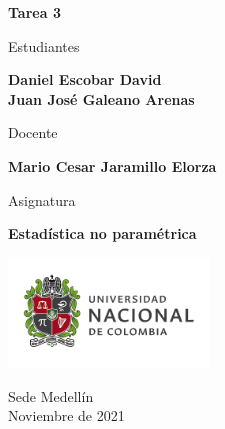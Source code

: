 \begin{titlepage}
   \Large{
   \begin{center}
       \vspace*{1cm}

       \textbf{Tarea 3}

            
       \vspace{1.5cm}
       
       Estudiantes
       
       \vspace{0.5cm}
        
        
       \textbf{Daniel Escobar David} \\

	\textbf{Juan José Galeano Arenas}

              \vspace{1cm}
       
       Docente
       
       \vspace{0.5cm}

       \textbf{Mario Cesar Jaramillo Elorza}
       
       \vspace{0.4cm}

       \vspace{1.4cm}
       
       Asignatura
       
       \vspace{0.5cm}

       \textbf{Estadística no paramétrica}

       \vfill

            
       \vspace{0.4cm}
     
       \includegraphics[width=0.4\textwidth]{logounal.png}
            
       Sede Medellín\\
       Noviembre de 2021
       
   \end{center}
   }
\end{titlepage}